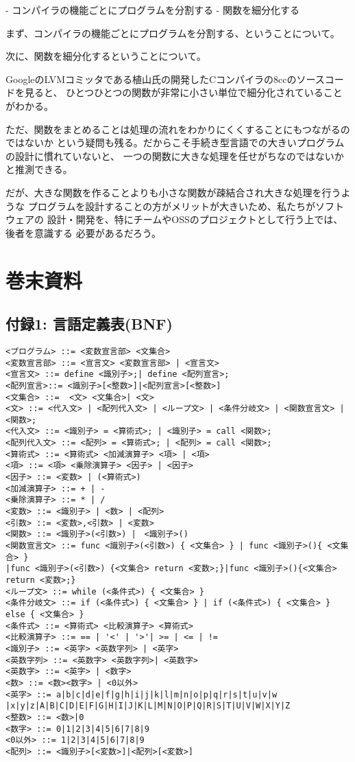 \documentclass[11pt,a4j]{jarticle}
\begin{document}
- コンパイラの機能ごとにプログラムを分割する
- 関数を細分化する

まず、コンパイラの機能ごとにプログラムを分割する、ということについて。


次に、関数を細分化するということについて。

GoogleのLVMコミッタである植山氏の開発したCコンパイラの8ccのソースコードを見ると、
ひとつひとつの関数が非常に小さい単位で細分化されていることがわかる。

ただ、関数をまとめることは処理の流れをわかりにくくすることにもつながるのではないか
という疑問も残る。だからこそ手続き型言語での大きいプログラムの設計に慣れていないと、
一つの関数に大きな処理を任せがちなのではないかと推測できる。

だが、大きな関数を作ることよりも小さな関数が疎結合され大きな処理を行うような
プログラムを設計することの方がメリットが大きいため、私たちがソフトウェアの
設計・開発を、特にチームやOSSのプロジェクトとして行う上では、後者を意識する
必要があるだろう。




\section{巻末資料}

\subsection{付録1: 言語定義表(BNF)}

{\baselineskip 2mm
\begin{verbatim}
<プログラム> ::= <変数宣言部> <文集合>
<変数宣言部> ::= <宣言文> <変数宣言部> | <宣言文>
<宣言文> ::= define <識別子>;| define <配列宣言>;
<配列宣言>::= <識別子>[<整数>]|<配列宣言>[<整数>]
<文集合> ::=  <文> <文集合>| <文>
<文> ::= <代入文> | <配列代入文> | <ループ文> | <条件分岐文> | <関数宣言文> | <関数>;
<代入文> ::= <識別子> = <算術式>; | <識別子> = call <関数>; 
<配列代入文> ::= <配列> = <算術式>; | <配列> = call <関数>;
<算術式> ::= <算術式> <加減演算子> <項> | <項>
<項> ::= <項> <乗除演算子> <因子> | <因子>
<因子> ::= <変数> | (<算術式>)
<加減演算子> ::= + | -
<乗除演算子> ::= * | /
<変数> ::= <識別子> | <数> | <配列>
<引数> ::= <変数>,<引数> | <変数>
<関数> ::= <識別子>(<引数>) |　<識別子>()
<関数宣言文> ::= func <識別子>(<引数>) { <文集合> } | func <識別子>(){ <文集合> }
|func <識別子>(<引数>) {<文集合> return <変数>;}|func <識別子>(){<文集合> return <変数>;}
<ループ文> ::= while (<条件式>) { <文集合> }
<条件分岐文> ::= if (<条件式>) { <文集合> } | if (<条件式>) { <文集合> } else { <文集合> }
<条件式> ::= <算術式> <比較演算子> <算術式>
<比較演算子> ::= == | '<' | '>'| >= | <= | !=
<識別子> ::= <英字> <英数字列> | <英字>
<英数字列> ::= <英数字> <英数字列>| <英数字>
<英数字> ::= <英字> | <数字>
<数> ::= <数><数字> | <0以外>
<英字> ::= a|b|c|d|e|f|g|h|i|j|k|l|m|n|o|p|q|r|s|t|u|v|w
|x|y|z|A|B|C|D|E|F|G|H|I|J|K|L|M|N|O|P|Q|R|S|T|U|V|W|X|Y|Z
<整数> ::= <数>|0
<数字> ::= 0|1|2|3|4|5|6|7|8|9
<0以外> ::= 1|2|3|4|5|6|7|8|9
<配列> ::= <識別子>[<変数>]|<配列>[<変数>]
\end{verbatim}}
\end{document}
